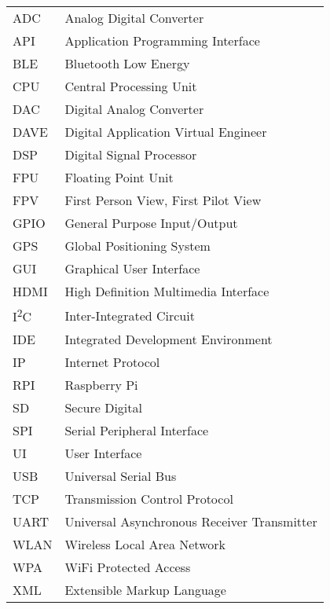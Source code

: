 \begin{singlespace}
\begin{flushleft}
\begin{longtable}{p{2 cm}p{14 cm}}
  ADC & Analog Digital Converter \\
  API & Application Programming Interface \\
  BLE & Bluetooth Low Energy \\
  CPU & Central Processing Unit \\
  DAC & Digital Analog Converter \\
  DAVE & Digital Application Virtual Engineer \\
  DSP & Digital Signal Processor \\
  FPU & Floating Point Unit \\
  FPV & First Person View, First Pilot View \\
  GPIO & General Purpose Input/Output \\
  GPS & Global Positioning System \\
  GUI & Graphical User Interface \\	
  HDMI & High Definition Multimedia Interface \\
  I\textsuperscript{2}C & Inter-Integrated Circuit \\
  IDE & Integrated Development Environment \\
  IP & Internet Protocol \\
  RPI & Raspberry Pi \\
  SD & Secure Digital \\
  SPI & Serial Peripheral Interface \\
  UI & User Interface \\
  USB & Universal Serial Bus \\
  TCP & Transmission Control Protocol \\
  UART & Universal Asynchronous Receiver Transmitter \\
  WLAN & Wireless Local Area Network \\
  WPA & WiFi Protected Access \\
  XML & Extensible Markup Language \\
\end{longtable}
\end{flushleft}
\end{singlespace}
